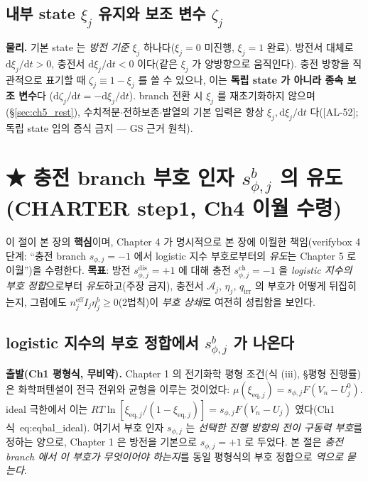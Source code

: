 \documentclass[11pt,a4paper]{article}
\newcommand{\dd}{\mathrm{d}}
\newcommand{\eff}{\mathrm{eff}}
\newcommand{\eq}{\mathrm{eq}}
\newcommand{\irr}{\mathrm{irr}}
\newcommand{\dis}{\mathrm{dis}}
\newcommand{\chg}{\mathrm{ch}}
\newcommand{\AL}[1]{\textsf{[AL-#1]}}
\begin{document}
\subsection{내부 state $\xi_j$ 유지와 보조 변수 $\zeta_j$}\label{sec:ch5_xikeep}
\textbf{물리.} 기본 state 는 \emph{방전 기준} $\xi_j$ 하나다($\xi_j=0$ 미진행, $\xi_j=1$ 완료). 방전서 대체로
$\dd\xi_j/\dd t>0$, 충전서 $\dd\xi_j/\dd t<0$ 이다(같은 $\xi_j$ 가 양방향으로 움직인다). 충전 방향을 직관적으로
표기할 때 $\zeta_j\equiv1-\xi_j$ 를 쓸 수 있으나, 이는 \textbf{독립 state 가 아니라 종속 보조 변수}다
($\dd\zeta_j/\dd t=-\dd\xi_j/\dd t$). branch 전환 시 $\xi_j$ 를 재초기화하지 않으며(\S\ref{sec:ch5_rest}),
수치적분$\cdot$전하보존$\cdot$발열의 기본 입력은 항상 $\xi_j,\dd\xi_j/\dd t$ 다(\AL{52}; 독립 state 임의
증식 금지 — GS 근거 원칙).

\section{★ 충전 branch 부호 인자 $s_{\phi,j}^b$ 의 유도 (CHARTER step1, Ch4 이월 수령)}\label{sec:ch5_chargesign}
이 절이 본 장의 \textbf{핵심}이며, Chapter 4 가 명시적으로 본 장에 이월한 책임(verifybox 4단계: ``충전 branch
$s_{\phi,j}=-1$ 에서 logistic 지수 부호로부터의 \emph{유도}는 Chapter 5 로 이월'')을 수령한다. \textbf{목표}:
방전 $s_{\phi,j}^\dis=+1$ 에 대해 충전 $s_{\phi,j}^\chg=-1$ 을 \emph{logistic 지수의 부호 정합}으로부터
\emph{유도}하고(주장 금지), 충전서 $\mathcal A_j$, $\eta_j$, $q_\irr$ 의 부호가 어떻게 뒤집히는지, 그럼에도
$n_j^{\eff}I_j\eta_j^b\ge0$(2법칙)이 \emph{부호 상쇄}로 여전히 성립함을 보인다.

\subsection{logistic 지수의 부호 정합에서 $s_{\phi,j}^b$ 가 나온다}\label{sec:ch5_sign_derive}
\textbf{출발(Ch1 평형식, 무비약).} Chapter 1 의 전기화학 평형 조건(식 (iii), \S 평형 진행률)은 화학퍼텐셜이
전극 전위와 균형을 이루는 것이었다: $\mu(\xi_{\eq,j})=s_{\phi,j}F(V_n-U_j^0)$. ideal 극한에서 이는
$RT\ln[\xi_{\eq,j}/(1-\xi_{\eq,j})]=s_{\phi,j}F(V_n-U_j)$ 였다(Ch1 식~eq:eqbal\_ideal). 여기서 부호 인자
$s_{\phi,j}$ 는 \emph{선택한 진행 방향의 전이 구동력 부호}를 정하는 양으로, Chapter 1 은 방전을 기본으로
$s_{\phi,j}=+1$ 로 두었다. 본 절은 \emph{충전 branch 에서 이 부호가 무엇이어야 하는지}를 동일 평형식의 부호
정합으로 \emph{역으로 묻는다}.
\end{document}
